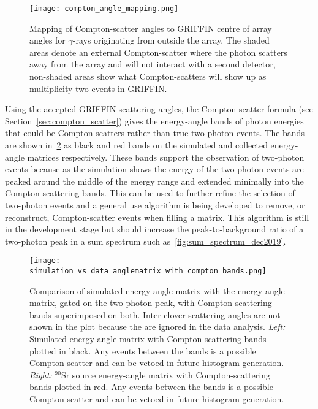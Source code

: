 \documentclass[cnatzke_thesis_proposal.tex]{subfiles}
\begin{document}
\begin{figure}[htbp]
  \centering
  \texttt{[image: compton\_angle\_mapping.png]}
  \caption{Mapping of Compton-scatter angles to GRIFFIN centre of array angles for $\gamma$-rays originating from outside the array. The shaded areas denote an external Compton-scatter where the photon scatters away from the array and will not interact with a second detector, non-shaded areas show what Compton-scatters will show up as multiplicity two events in GRIFFIN.}
  \label{fig:compton_angle_mapping}
\end{figure}

Using the accepted GRIFFIN scattering angles, the Compton-scatter formula (see Section~\ref{sec:compton_scatter}) gives the energy-angle bands of photon energies that could be Compton-scatters rather than true two-photon events.
The bands are shown in~\ref{fig:simulation_data_comparison_with_compton_bands} as black and red bands on the simulated and collected energy-angle matrices respectively.
These bands support the observation of two-photon events because as the simulation shows the energy of the two-photon events are peaked around the middle of the energy range and extended minimally into the Compton-scattering bands. 
This can be used to further refine the selection of two-photon events and a general use algorithm is being developed to remove, or reconstruct, Compton-scatter events when filling a matrix. 
This algorithm is still in the development stage but should increase the peak-to-background ratio of a two-photon peak in a sum spectrum such as~\ref{fig:sum_spectrum_dec2019}.

\begin{figure}[htbp]
  \centering
  \texttt{[image: simulation\_vs\_data\_anglematrix\_with\_compton\_bands.png]}
  \caption{Comparison of simulated energy-angle matrix with the energy-angle matrix, gated on the two-photon peak, with Compton-scattering bands superimposed on both. Inter-clover scattering angles are not shown in the plot because the are ignored in the data analysis.  
    \textit{Left:} Simulated energy-angle matrix with Compton-scattering bands plotted in black. Any events between the bands is a possible Compton-scatter and can be vetoed in future histogram generation.
    \textit{Right:} $^{90}$Sr source energy-angle matrix with Compton-scattering bands plotted in red. Any events between the bands is a possible Compton-scatter and can be vetoed in future histogram generation.
  }
  \label{fig:simulation_data_comparison_with_compton_bands}
\end{figure}
\end{document}
